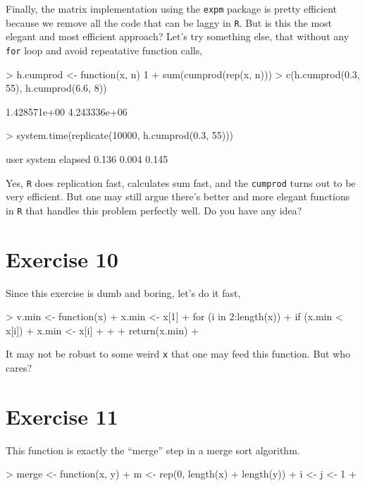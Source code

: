 \documentclass{article}
\begin{document}
Finally, the matrix implementation using the \verb=expm= package is pretty efficient because we remove all the code that can be laggy in \verb=R=. But is this the most elegant and most efficient approach? Let's try something else, that without any \verb=for= loop and avoid repeatative function calls,
\begin{Schunk}
\begin{Sinput}
> h.cumprod <- function(x, n) 1 + sum(cumprod(rep(x, n)))
> c(h.cumprod(0.3, 55), h.cumprod(6.6, 8))
\end{Sinput}
\begin{Soutput}
[1] 1.428571e+00 4.243336e+06
\end{Soutput}
\begin{Sinput}
> system.time(replicate(10000, h.cumprod(0.3, 55)))
\end{Sinput}
\begin{Soutput}
   user  system elapsed 
  0.136   0.004   0.145 
\end{Soutput}
\end{Schunk}

Yes, \verb=R= does replication fast, calculates sum fast, and the \verb=cumprod= turns out to be very efficient. But one may still argue there's better and more elegant functions in \verb=R= that handles this problem perfectly well. Do you have any idea?

\section{Exercise 10}
Since this exercise is dumb and boring, let's do it fast,
\begin{Schunk}
\begin{Sinput}
> v.min <- function(x) {
+     x.min <- x[1]
+     for (i in 2:length(x)) {
+         if (x.min < x[i]) {
+             x.min <- x[i]
+         }
+     }
+     return(x.min)
+ }
\end{Sinput}
\end{Schunk}
It may not be robust to some weird \verb=x= that one may feed this function. But who cares? 

\section{Exercise 11}
This function is exactly the ``merge'' step in a merge sort algorithm. 
\begin{Schunk}
\begin{Sinput}
> merge <- function(x, y) {
+     m <- rep(0, length(x) + length(y))
+     i <- j <- 1
+ }
\end{Sinput}
\end{Schunk}
\end{document}
